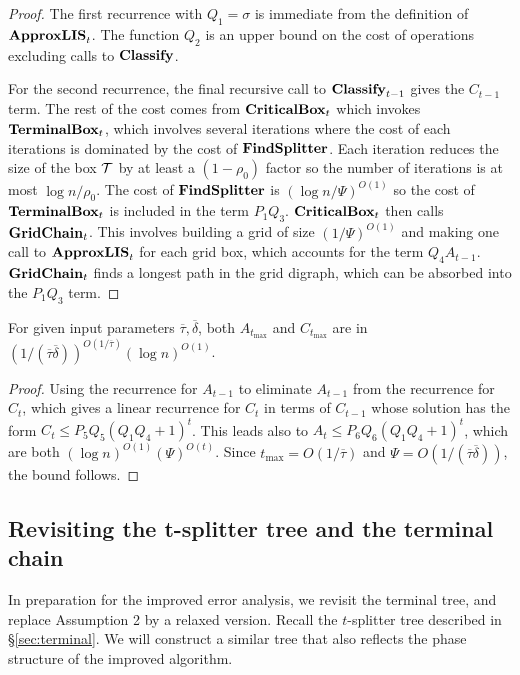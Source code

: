 \documentclass{acmsmall}
\newcommand{\cB}{{\cal B}}
\newcommand{\cT}{{\cal T}}
\newcommand{\Sec}[1]{\hyperref[sec:#1]{\S\ref*{sec:#1}}} %
\newcommand{\Thm}[1]{\hyperref[thm:#1]{Thm.\,\ref*{thm:#1}}} %
\newcommand{\lis}{{\tt lis}}
\newcommand{\terminalbox}{{\rm{\bf TerminalBox}}}
\newcommand{\deltapar}{\overline{\delta}}
\newcommand{\taupar}{\overline{\tau}}
\newcommand{\errorcont}{\Psi}
\newcommand{\ssz}{\sigma}
\newcommand{\classify}{{\rm {\bf Classify}}}
\newcommand{\approxlis}{{\rm {\bf ApproxLIS}}}
\newcommand{\critbox}{{\rm {\bf CriticalBox}}}
\newcommand{\findsplitter}{{\rm {\bf FindSplitter}}}
\newcommand{\gridchain}{{\rm {\bf GridChain}}}
\begin{document}
\begin{proof}
The first recurrence with $Q_1=\ssz$ is immediate from the definition of 
$\approxlis_t$.   The function $Q_2$ is an upper bound on the cost of operations excluding calls to $\classify$.

For the second recurrence, the final recursive call to $\classify_{t-1}$  gives the $C_{t-1}$ term.
The rest of the cost comes from  $\critbox_t$ which invokes $\terminalbox_t$, which involves several iterations
where the cost of each iterations is dominated by the cost of $\findsplitter$.  Each iteration reduces the size of the
box $\cT$ by at least a $(1-\rho_0)$ factor so the number of iterations is at most $\log n/\rho_0$.  The cost of $\findsplitter$ is $(\log n/\errorcont)^{O(1)}$
so the cost of $\terminalbox_t$ is included in the term $P_1Q_3$. 
$\critbox_t$ then calls $\gridchain_t$.  This involves building a grid of
size $(1/\errorcont)^{O(1)}$ and making one call to $\approxlis_t$ for each grid box, which accounts for the term $Q_4 A_{t-1}$.  
$\gridchain_t$ finds a longest path in  the grid digraph, which can be absorbed into the $P_1Q_3$ term.  
\end{proof}

\begin{corollary} \label{cor:imp-time}
For given input parameters $\taupar, \deltapar$, both $A_{t_{\max}}$ and $C_{t_{\max}}$ are in $(1/(\taupar\deltapar))^{O(1/\taupar)}(\log n)^{O(1)}$.
\end{corollary}

\begin{proof} Using the recurrence for $A_{t-1}$ to eliminate $A_{t-1}$ from
the recurrence for $C_t$, which gives a linear recurrence for $C_t$ in terms of $C_{t-1}$
whose solution has the form $C_t \leq P_5Q_5(Q_1Q_4+1)^t$.  This leads also to  $A_t \leq P_6Q_6(Q_1Q_4+1)^t$,  which are both $(\log n)^{O(1)}(\errorcont)^{O(t)}$.
Since $t_{\max} = O(1/\taupar)$ and $\errorcont = O(1/(\taupar\deltapar))$, the bound follows.
\end{proof}

\subsection{Revisiting the t-splitter tree and the terminal chain}
\label{sec:revised}

In preparation for the improved error analysis, we revisit the terminal tree, and replace Assumption 2 by a relaxed version.
Recall the $t$-splitter tree described in \Sec{terminal}.  We will construct a similar tree that also
reflects the phase structure of the improved algorithm.
\end{document}
